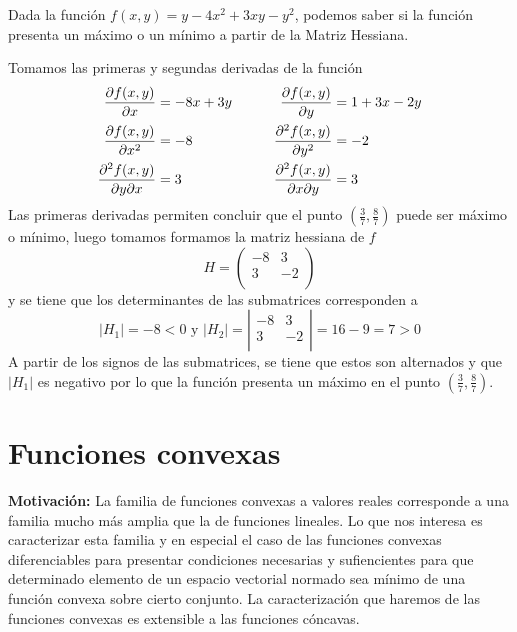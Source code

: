 \begin{ejemplo}
Dada la funci\'on $f(x,y)=y-4x^2+3xy-y^2$, podemos saber si la funci\'on presenta un m\'aximo o un m\'inimo a partir de la Matriz Hessiana.
\end{ejemplo}

\begin{solucion} Tomamos las primeras y segundas derivadas de la funci\'on
\begin{align*}
\frac{\partial f(x,y)}{\partial x}    &=-8x+3y &\qquad \frac{\partial f(x,y)}{\partial y}      &=1+3x-2y \\
\frac{\partial f(x,y)}{\partial x^2}  &=-8     &\qquad \frac{\partial ^2 f(x,y)}{\partial y^2} &=-2      \\
\frac{\partial ^2 f(x,y)}{\partial y \partial x}&=3      &\qquad \frac{\partial ^2 f(x,y)}{\partial x \partial y}  &=3 
\end{align*}
Las primeras derivadas permiten concluir que el punto $(\frac{3}{7},\frac{8}{7})$ puede ser m\'aximo o m\'inimo, luego tomamos formamos la matriz hessiana de $f$
$$
H=\left(\begin{array}{cc}
-8 & 3  \\
3  & -2 \\ \end{array} \right)
$$
y se tiene que los determinantes de las submatrices corresponden a
$$
|H_1|=-8<0 \text{ y }
|H_2|=\left|\begin{array}{cc}
-8 & 3  \\
3  & -2 \\ \end{array} \right|=16-9=7>0
$$
A partir de los signos de las submatrices, se tiene que estos son alternados y que $|H_1|$ es negativo por lo que la funci\'on presenta un m\'aximo en el punto $(\frac{3}{7},\frac{8}{7})$.
\end{solucion}

\section{Funciones convexas}\label{funciones-convexas}

\textbf{Motivaci\'on:} La familia de funciones convexas a valores reales corresponde a una familia mucho m\'as amplia que la de funciones lineales. Lo que nos interesa es caracterizar esta familia y en especial el caso de las funciones convexas diferenciables para presentar condiciones necesarias y sufiencientes para que determinado elemento de un espacio vectorial normado sea m\'inimo de una funci\'on convexa sobre cierto conjunto. La caracterizaci\'on que haremos de las funciones convexas es extensible a las funciones c\'oncavas.

